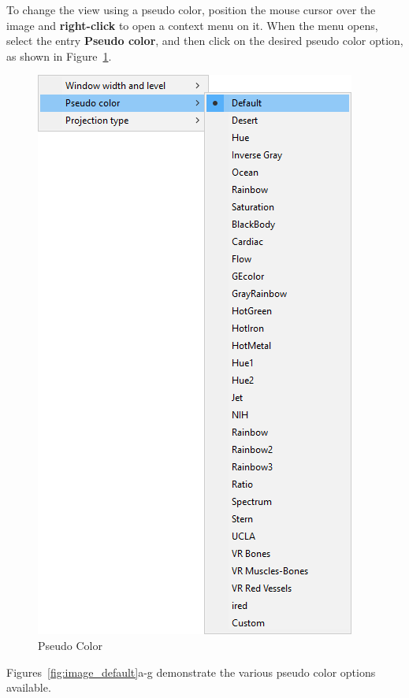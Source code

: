 To change the view using a pseudo color, position the mouse cursor over the image and \textbf{right-click} to open a context menu on it. When the menu opens, select the entry \textbf{Pseudo color}, and then click on the desired pseudo color option, as shown in Figure~\ref{fig:pseudo_color}.

\begin{figure}[p]
\centering
\includegraphics[scale=0.40]{../user_guide_figures/invesalius_screen/pseudo_menu_en.png}
\caption{Pseudo Color}
\label{fig:pseudo_color}
\end{figure}

Figures~\ref{fig:image_default}a-g demonstrate the various pseudo color options available.

